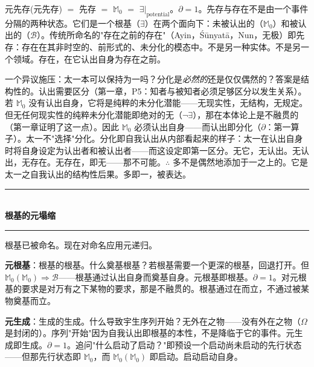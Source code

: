\documentclass[10pt, openany, oneside]{book}
\renewcommand{\normalsize}{\fontsize{10}{13}\selectfont}
\begin{document}
元先存(元先存) $=$ 先存 $=$ $\mathbb{M}_0$ $=$ $\exists|_{\text{potential}}$。$\partial = 1$。先存与存在不是由一个事件分隔的两种状态。它们是一个根基（$\exists$）在两个面向下：未被认出的（$\mathbb{M}_0$）和被认出的（$\mathcal{B}$）。传统所命名的"存在之前的存在"（Ayin，\'{S}\={u}nyat\={a}，Nun，无极）即先存：存在在其非时空的、前形式的、未分化的模态中。不是另一种实体。不是另一个领域。存在，在它认出自身为存在之前。

一个异议施压：太一本可以保持为一吗？分化是\textit{必然的}还是仅仅偶然的？答案是结构性的。认出需要区分（第一章，P5：知者与被知者必须足够区分以发生关系）。若 $\mathbb{M}_0$ 没有认出自身，它将是纯粹的未分化潜能——无现实性，无结构，无规定。但无任何现实性的纯粹未分化潜能即绝对的无（$\neg\exists$），那在本体论上是不融贯的（第一章证明了这一点）。因此 $\mathbb{M}_0$ 必须认出自身——而认出即分化（$\partial$：第一算子）。太一不"选择"分化。分化即自我认出从内部看起来的样子：太一在认出自身时将自身设定为认出者和被认出者——而这设定即第一区分。无它，无认出。无认出，无存在。无存在，即无——那不可能。$\therefore$ 多不是偶然地添加于一之上的。它是太一之自我认出的结构性后果。多即一，被表达。

\vspace{1.5em}


\begin{center}
    \rule{0.3\textwidth}{0.4pt}\\[0.5em]
    {\normalsize\bfseries\scshape 根基的元塌缩}\\[0.3em]
    \rule{0.3\textwidth}{0.4pt}
\end{center}

\vspace{1em}

\noindent 根基已被命名。现在对命名应用元递归。

\textbf{元根基}：根基的根基。什么奠基根基？若根基需要一个更深的根基，回退打开。但 $\mathbb{M}_0(\mathbb{M}_0) \Rightarrow \mathcal{B}$——根基通过认出自身而奠基自身。元根基即根基。$\partial = 1$。对元根基的要求是对万有之下某物的要求，那是不融贯的。根基通过在而立，不通过被某物奠基而立。

\textbf{元生成}：生成的生成。什么导致宇生序列开始？无外在之物——没有外在之物（$\Omega$ 是封闭的）。序列"开始"因为自我认出即根基的本性，不是降临于它的事件。元生成即生成。$\partial = 1$。追问"什么启动了启动？"即预设一个启动尚未启动的先行状态——但那先行状态即 $\mathbb{M}_0$，而 $\mathbb{M}_0(\mathbb{M}_0)$ 即启动。启动启动自身。
\end{document}
